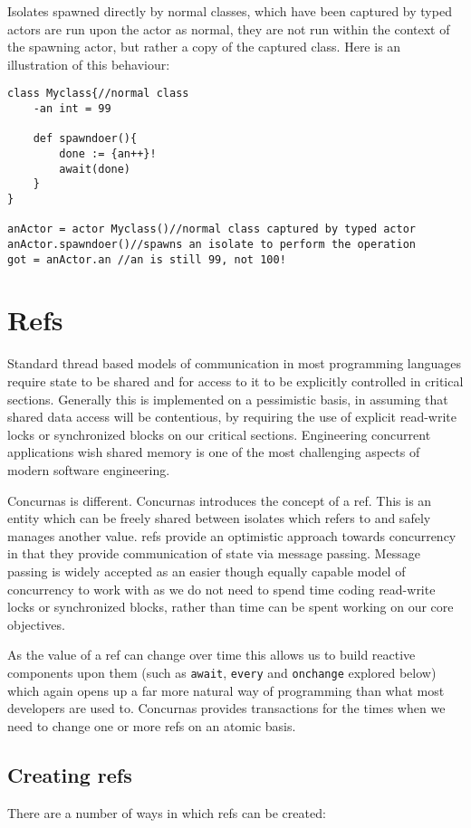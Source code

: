\documentclass[conc-doc]{subfiles}
\begin{document}
Isolates spawned directly by normal classes, which have been captured by typed actors are run upon the actor as normal, they are not run within the context of the spawning actor, but rather a copy of the captured class. Here is an illustration of this behaviour:
\begin{lstlisting}
class Myclass{//normal class
	-an int = 99
	
	def spawndoer(){
		done := {an++}!
		await(done)	
	}
}

anActor = actor Myclass()//normal class captured by typed actor
anActor.spawndoer()//spawns an isolate to perform the operation
got = anActor.an //an is still 99, not 100!
\end{lstlisting}


\section{Refs}
\label{sec:refs}
Standard thread based models of communication in most programming languages require state to be shared and for access to it to be explicitly controlled in critical sections. Generally this is implemented on a pessimistic basis, in assuming that shared data access will be contentious, by requiring the use of explicit read-write locks or synchronized blocks on our critical sections. Engineering concurrent applications wish shared memory is one of the most challenging aspects of modern software engineering.

Concurnas is different. Concurnas introduces the concept of a ref. This is an entity which can be freely shared between isolates which refers to and safely manages another value. refs provide an optimistic approach towards concurrency in that they provide communication of state via message passing. Message passing is widely accepted as an easier though equally capable model of concurrency to work with as we do not need to spend time coding read-write locks or synchronized blocks, rather than time can be spent working on our core objectives.

As the value of a ref can change over time this allows us to build reactive components upon them (such as \lstinline{await}, \lstinline{every} and \lstinline{onchange} explored below) which again opens up a far more natural way of programming than what most developers are used to. Concurnas provides transactions for the times when we need to change one or more refs on an atomic basis.

\subsection{Creating refs}
There are a number of ways in which refs can be created:
\end{document}
